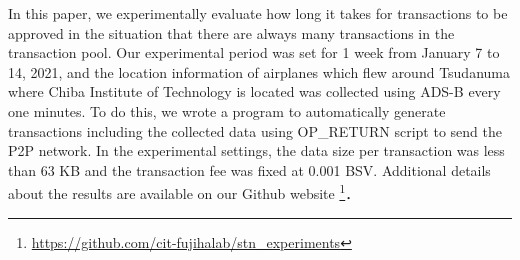 \documentclass[graybox]{svmult}
\begin{document}
In this paper, we experimentally evaluate how long it takes for transactions to be approved in the situation that there are always many transactions in the transaction pool. 
Our experimental period was set for 1 week from January 7 to 14, 2021, and the location information of airplanes which flew around Tsudanuma where Chiba Institute of Technology is located was collected using ADS-B \cite{flightradar24} every one minutes. 
To do this, we wrote a program to automatically generate transactions including the collected data using OP\_RETURN script to send the P2P network. 
In the experimental settings, the data size per transaction was less than 63 KB and the transaction fee was fixed at 0.001 BSV. 
Additional details about the results are available on our Github website 
\footnote{\url{https://github.com/cit-fujihalab/stn_experiments}}．
\end{document}
